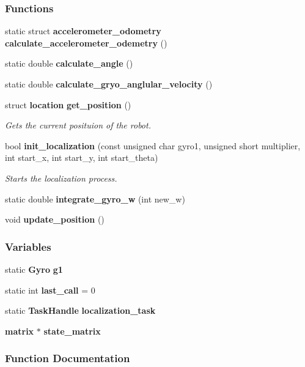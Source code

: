 \subsubsection*{Functions}
\begin{DoxyCompactItemize}
\item 
static struct \textbf{ accelerometer\+\_\+odometry} \textbf{ calculate\+\_\+accelerometer\+\_\+odemetry} ()
\item 
static double \textbf{ calculate\+\_\+angle} ()
\item 
static double \textbf{ calculate\+\_\+gryo\+\_\+anglular\+\_\+velocity} ()
\item 
struct \textbf{ location} \textbf{ get\+\_\+position} ()
\begin{DoxyCompactList}\small\item\em Gets the current posituion of the robot. \end{DoxyCompactList}\item 
bool \textbf{ init\+\_\+localization} (const unsigned char gyro1, unsigned short multiplier, int start\+\_\+x, int start\+\_\+y, int start\+\_\+theta)
\begin{DoxyCompactList}\small\item\em Starts the localization process. \end{DoxyCompactList}\item 
static double \textbf{ integrate\+\_\+gyro\+\_\+w} (int new\+\_\+w)
\item 
void \textbf{ update\+\_\+position} ()
\end{DoxyCompactItemize}
\subsubsection*{Variables}
\begin{DoxyCompactItemize}
\item 
static \textbf{ Gyro} \textbf{ g1}
\item 
static int \textbf{ last\+\_\+call} = 0
\item 
static \textbf{ Task\+Handle} \textbf{ localization\+\_\+task}
\item 
\textbf{ matrix} $\ast$ \textbf{ state\+\_\+matrix}
\end{DoxyCompactItemize}


\subsubsection{Function Documentation}
\mbox{\label{localization_8c_a6785e4b3b61887f28028f05019b9b39d}} 
